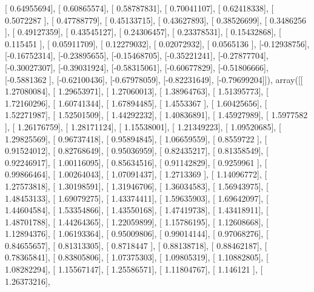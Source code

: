 \documentclass{article}
\begin{document}
       [ 0.64955694],
       [ 0.60865574],
       [ 0.58787831],
       [ 0.70041107],
       [ 0.62418338],
       [ 0.5072287 ],
       [ 0.47788779],
       [ 0.45133715],
       [ 0.43627893],
       [ 0.38526699],
       [ 0.3486256 ],
       [ 0.49127359],
       [ 0.43545127],
       [ 0.24306457],
       [ 0.23378531],
       [ 0.15432868],
       [ 0.115451  ],
       [ 0.05911709],
       [ 0.12279032],
       [ 0.02072932],
       [ 0.0565136 ],
       [-0.12938756],
       [-0.16752314],
       [-0.23895655],
       [-0.15468705],
       [-0.35221241],
       [-0.27877704],
       [-0.30027307],
       [-0.39031924],
       [-0.58315061],
       [-0.60677829],
       [-0.51806666],
       [-0.5881362 ],
       [-0.62100436],
       [-0.67978059],
       [-0.82231649],
       [-0.79699204]]), array([[ 1.27080084],
       [ 1.29653971],
       [ 1.27060013],
       [ 1.38964763],
       [ 1.51395773],
       [ 1.72160296],
       [ 1.60741344],
       [ 1.67894485],
       [ 1.4553367 ],
       [ 1.60425656],
       [ 1.52271987],
       [ 1.52501509],
       [ 1.44292232],
       [ 1.40836891],
       [ 1.45927989],
       [ 1.5977582 ],
       [ 1.26176759],
       [ 1.28171124],
       [ 1.15538001],
       [ 1.21349223],
       [ 1.09520685],
       [ 1.29825569],
       [ 0.96737418],
       [ 0.95894845],
       [ 1.06659559],
       [ 0.8559722 ],
       [ 0.91524012],
       [ 0.82768649],
       [ 0.95036959],
       [ 0.82435217],
       [ 0.81358549],
       [ 0.92246917],
       [ 1.00116095],
       [ 0.85634516],
       [ 0.91142829],
       [ 0.9259961 ],
       [ 0.99866464],
       [ 1.00264043],
       [ 1.07091437],
       [ 1.2713369 ],
       [ 1.14096772],
       [ 1.27573818],
       [ 1.30198591],
       [ 1.31946706],
       [ 1.36034583],
       [ 1.56943975],
       [ 1.48453133],
       [ 1.69079275],
       [ 1.43374411],
       [ 1.59635903],
       [ 1.69642097],
       [ 1.44604584],
       [ 1.53354866],
       [ 1.43550168],
       [ 1.47419738],
       [ 1.43418911],
       [ 1.48701788],
       [ 1.44264365],
       [ 1.22059899],
       [ 1.15786195],
       [ 1.12608668],
       [ 1.12894376],
       [ 1.06193364],
       [ 0.95009806],
       [ 0.99014144],
       [ 0.97068276],
       [ 0.84655657],
       [ 0.81313305],
       [ 0.8718447 ],
       [ 0.88138718],
       [ 0.88462187],
       [ 0.78365841],
       [ 0.83805806],
       [ 1.07375303],
       [ 1.09805319],
       [ 1.10882805],
       [ 1.08282294],
       [ 1.15567147],
       [ 1.25586571],
       [ 1.11804767],
       [ 1.146121  ],
       [ 1.26373216],
\end{document}
